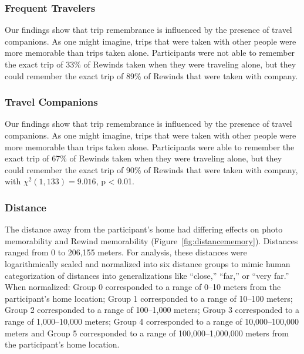 \documentclass{sigchi}
\begin{document}
\subsubsection{Frequent Travelers}
Our findings show that trip remembrance is influenced by the presence of travel companions. As one might imagine, trips that were taken with other people were more memorable than trips taken alone. Participants were not able to remember the exact trip of 33\% of Rewinds taken when they were traveling alone, but they could remember the exact trip of 89\% of Rewinds that were taken with company.


\subsubsection{Travel Companions}
Our findings show that trip remembrance is influenced by the presence of travel companions. As one might imagine, trips that were taken with other people were more memorable than trips taken alone. Participants were able to remember the exact trip of 67\% of Rewinds taken when they were traveling alone, but they could remember the exact trip of 90\% of Rewinds that were taken with company, with $\chi^2(1,133) = 9.016$, p < 0.01.


\subsubsection{Distance}
The distance away from the participant’s home had differing effects on photo memorability and Rewind memorability (Figure~\ref{fig:distancememory}). Distances ranged from 0 to 206,155 meters. For analysis, these distances were logarithmically scaled and normalized into six distance groups to mimic human categorization of distances into generalizations like ``close,'' ``far,'' or ``very far.'' When normalized: Group 0 corresponded to a range of 0--10 meters from the participant's home location; Group 1 corresponded to a range of 10--100 meters; Group 2 corresponded to a range of 100--1,000 meters; Group 3 corresponded to a range of 1,000--10,000 meters; Group 4 corresponded to a range of 10,000--100,000 meters and Group 5 corresponded to a range of 100,000--1,000,000 meters from the participant's home location. 
\end{document}
